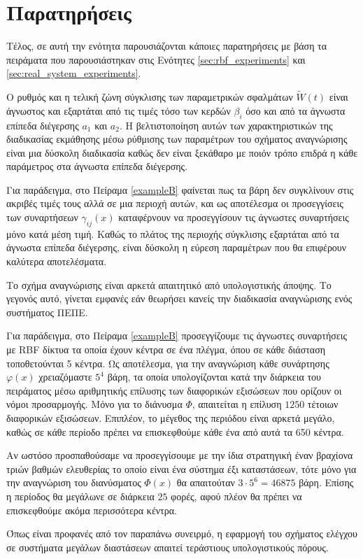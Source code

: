 \section{Παρατηρήσεις}
\label{eq:remarks_on_exp}
Τέλος, σε αυτή την ενότητα παρουσιάζονται κάποιες παρατηρήσεις με βάση τα πειράματα που παρουσιάστηκαν στις Ενότητες \ref{sec:rbf_experiments} και \ref{sec:real_system_experiments}.\\

\begin{remark}
	Ο ρυθμός και η τελική ζώνη σύγκλισης των παραμετρικών σφαλμάτων $\tilde{W}(t)$ είναι άγνωστος και εξαρτάται από τις τιμές τόσο των κερδών $\beta_i$ όσο και από τα άγνωστα επίπεδα διέγερσης $a_1$ και $a_2$. Η βελτιστοποίηση αυτών των χαρακτηριστικών της διαδικασίας εκμάθησης μέσω ρύθμισης των παραμέτρων του σχήματος αναγνώρισης είναι μια δύσκολη διαδικασία καθώς δεν είναι ξεκάθαρο με ποιόν τρόπο επιδρά η κάθε παράμετρος στα άγνωστα επίπεδα διέγερσης.
	
	Για παράδειγμα, στο Πείραμα \ref{exampleB} φαίνεται πως τα βάρη δεν συγκλίνουν στις ακριβές τιμές τους αλλά σε μια περιοχή αυτών, και ως αποτέλεσμα οι προσεγγίσεις των συναρτήσεων $\gamma_{ij}(x)$ καταφέρνουν να προσεγγίσουν τις άγνωστες συναρτήσεις μόνο κατά μέση τιμή. Καθώς το πλάτος της περιοχής σύγκλισης εξαρτάται από τα άγνωστα επίπεδα διέγερσης, είναι δύσκολη η εύρεση παραμέτρων που θα επιφέρουν καλύτερα αποτελέσματα.\\
\end{remark}

\begin{remark}
	Το σχήμα αναγνώρισης είναι αρκετά απαιτητικό από υπολογιστικής άποψης. Το γεγονός αυτό, γίνεται εμφανές εάν θεωρήσει κανείς την διαδικασία αναγνώρισης ενός συστήματος ΠΕΠΕ.
	
	Για παράδειγμα, στο Πείραμα \ref{exampleB} προσεγγίζουμε τις άγνωστες συναρτήσεις με RBF δίκτυα τα οποία έχουν κέντρα σε ένα πλέγμα, όπου σε κάθε διάσταση τοποθετούνται 5 κέντρα. Ως αποτέλεσμα, για την αναγνώριση κάθε συνάρτησης $\varphi(x)$ χρειαζόμαστε $5^4$ βάρη, τα οποία υπολογίζονται κατά την διάρκεια του πειράματος μέσω αριθμητικής επίλυσης των διαφορικών εξισώσεων που ορίζουν οι νόμοι προσαρμογής. Μόνο για το διάνυσμα $\Phi$, απαιτείται η επίλυση $1250$ τέτοιων διαφορικών εξισώσεων. Επιπλέον, το μέγεθος της περιόδου είναι αρκετά μεγάλο, καθώς σε κάθε περίοδο πρέπει να επισκεφθούμε κάθε ένα από αυτά τα 650 κέντρα.
	
	Αν ωστόσο προσπαθούσαμε να προσεγγίσουμε με την ίδια στρατηγική έναν βραχίονα τριών βαθμών ελευθερίας το οποίο είναι ένα σύστημα έξι καταστάσεων, τότε μόνο για την αναγνώριση του διανύσματος $\Phi(x)$ θα απαιτούταν $3 \cdot 5^6 = 46875$ βάρη. Επίσης η περίοδος θα μεγάλωνε σε διάρκεια $25$ φορές, αφού πλέον θα πρέπει να επισκεφθούμε ακόμα περισσότερα κέντρα.
	
	Όπως είναι προφανές από τον παραπάνω συνειρμό, η εφαρμογή του σχήματος ελέγχου σε συστήματα μεγάλων διαστάσεων απαιτεί τεράστιους υπολογιστικούς πόρους.\\
\end{remark}

